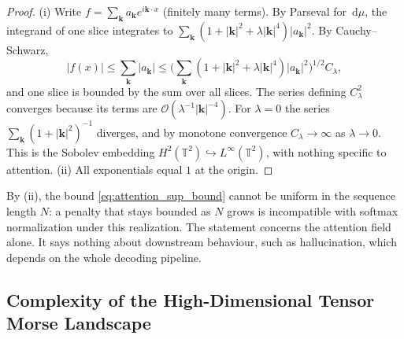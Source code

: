 \documentclass[11pt,a4paper,reqno]{amsart}
\theoremstyle{definition}
\numberwithin{equation}{section}
\newcommand{\Tor}{\mathbb{T}}
\newcommand{\dif}{\,\mathrm{d}}
\begin{document}
\begin{proof}
(i) Write $f = \sum_{\mathbf{k}} a_{\mathbf{k}} e^{i \mathbf{k}\cdot x}$ (finitely many terms). By Parseval for $\dif\mu$, the integrand of one slice integrates to $\sum_{\mathbf{k}} (1 + |\mathbf{k}|^2 + \lambda |\mathbf{k}|^4) |a_{\mathbf{k}}|^2$. By Cauchy--Schwarz,
\[
|f(x)| \le \sum_{\mathbf{k}} |a_{\mathbf{k}}| \le \Big( \sum_{\mathbf{k}} (1 + |\mathbf{k}|^2 + \lambda |\mathbf{k}|^4) |a_{\mathbf{k}}|^2 \Big)^{1/2} C_\lambda,
\]
and one slice is bounded by the sum over all slices. The series defining $C_\lambda^2$ converges because its terms are $\mathcal{O}(\lambda^{-1}|\mathbf{k}|^{-4})$. For $\lambda = 0$ the series $\sum_{\mathbf{k}} (1 + |\mathbf{k}|^2)^{-1}$ diverges, and by monotone convergence $C_\lambda \to \infty$ as $\lambda \to 0$. This is the Sobolev embedding $H^2(\Tor^2) \hookrightarrow L^\infty(\Tor^2)$, with nothing specific to attention. (ii) All exponentials equal $1$ at the origin.
\end{proof}

By (ii), the bound \eqref{eq:attention_sup_bound} cannot be uniform in the sequence length $N$: a penalty that stays bounded as $N$ grows is incompatible with softmax normalization under this realization. The statement concerns the attention field alone. It says nothing about downstream behaviour, such as hallucination, which depends on the whole decoding pipeline.

\subsection{Complexity of the High-Dimensional Tensor Morse Landscape}
\label{subsec:kac_rice_tensors}
\end{document}
